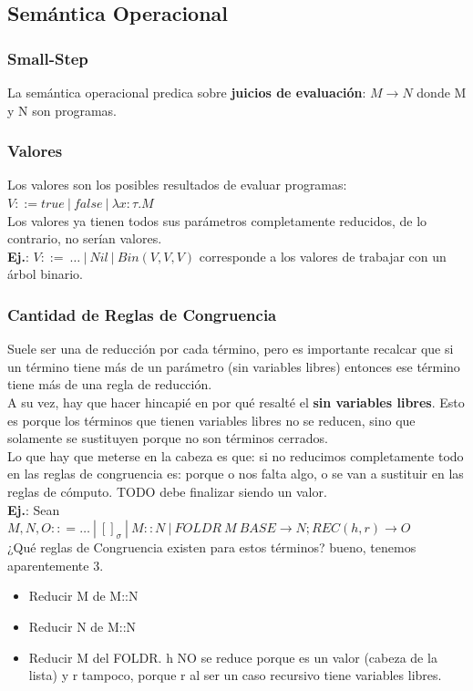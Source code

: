 \documentclass[10pt,a4paper]{article}
\begin{document}
\subsection{Semántica Operacional}
\subsubsection{Small-Step}
La semántica operacional predica sobre \textbf{juicios de evaluación}: $M \rightarrow N$ donde M y N son programas. 
\subsubsection{Valores}
Los valores son los posibles resultados de evaluar programas: $V::=true \ |\ false \ | \ \lambda x: \tau.M$ \\
Los valores ya tienen todos sus parámetros completamente reducidos, de lo contrario, no serían valores. \\
\textbf{Ej.}: $V ::= \ \dots \ | \ Nil \ | \ Bin(V, V, V)$ corresponde a los valores de trabajar con un árbol binario. 
\subsubsection*{Cantidad de Reglas de Congruencia}
Suele ser una de reducción por cada término, pero es importante recalcar que si un término tiene más de un parámetro (sin variables libres) entonces ese término tiene más de una regla de reducción. \\
A su vez, hay que hacer hincapié en por qué resalté el \textbf{sin variables libres}. Esto es porque los términos que tienen variables libres no se reducen, sino que solamente se sustituyen porque no son términos cerrados. \\
Lo que hay que meterse en la cabeza es que: si no reducimos completamente todo en las reglas de congruencia es: porque o nos falta algo, o se van a sustituir en las reglas de cómputo. TODO debe finalizar siendo un valor. \\
\textbf{Ej.}: Sean $M,N,O :: = \dots \ | \ []_{\sigma} \ | \ M::N \ | \ FOLDR \ M \ BASE \rightarrow N; REC(h,r) \rightarrow O$ \\
¿Qué reglas de Congruencia existen para estos términos? bueno, tenemos aparentemente 3.
\begin{itemize}
    \item Reducir M de M::N
    \item Reducir N de M::N
    \item Reducir M del FOLDR. h NO se reduce porque es un valor (cabeza de la lista) y r tampoco, porque r al ser un caso recursivo tiene variables libres. 
\end{itemize}
\end{document}
